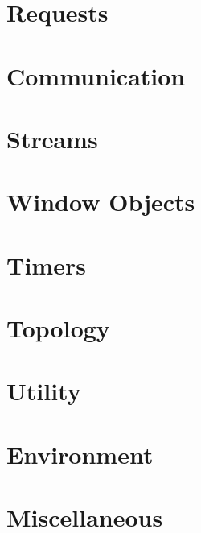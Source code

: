 \documentclass{article}
\begin{document}
\section{Requests}


\section{Communication}



\section{Streams}



\section{Window Objects}


\section{Timers}


\section{Topology}



\section{Utility}

 

\section{Environment}


\newread\testfile
\openin{}
\ifeof\testfile\else
\section{Miscellaneous}

\fi
\closein\testfile
\end{document}

